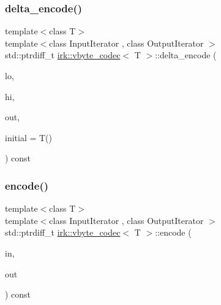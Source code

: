 \mbox{\label{structirk_1_1vbyte__codec_a233660cc818ce569c0a0118ce74d46f2}} 
\subsubsection{\texorpdfstring{delta\+\_\+encode()}{delta\_encode()}}
{\footnotesize\ttfamily template$<$class T$>$ \\
template$<$class Input\+Iterator , class Output\+Iterator $>$ \\
std\+::ptrdiff\+\_\+t \mbox{\hyperlink{structirk_1_1vbyte__codec}{irk\+::vbyte\+\_\+codec}}$<$ T $>$\+::delta\+\_\+encode (\begin{DoxyParamCaption}\item[{Input\+Iterator}]{lo,  }\item[{Input\+Iterator}]{hi,  }\item[{Output\+Iterator}]{out,  }\item[{T}]{initial = {\ttfamily T()} }\end{DoxyParamCaption}) const\hspace{0.3cm}{\ttfamily [inline]}}

\mbox{\label{structirk_1_1vbyte__codec_a5025310850ce7856699773f082f71c3a}} 
\subsubsection{\texorpdfstring{encode()}{encode()}\hspace{0.1cm}{\footnotesize\ttfamily [1/2]}}
{\footnotesize\ttfamily template$<$class T$>$ \\
template$<$class Input\+Iterator , class Output\+Iterator $>$ \\
std\+::ptrdiff\+\_\+t \mbox{\hyperlink{structirk_1_1vbyte__codec}{irk\+::vbyte\+\_\+codec}}$<$ T $>$\+::encode (\begin{DoxyParamCaption}\item[{Input\+Iterator}]{in,  }\item[{Output\+Iterator}]{out }\end{DoxyParamCaption}) const\hspace{0.3cm}{\ttfamily [inline]}}

